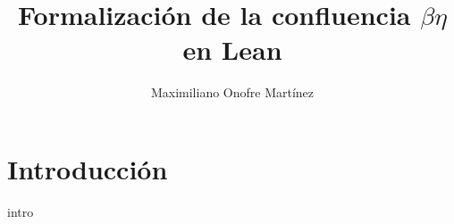 \documentclass[
  spanish,
  letterpaper,
  DIV=11,
  numbers=noendperiod]{scrreprt}
\title{Formalización de la confluencia \(\beta\eta\) en Lean}
\author{Maximiliano Onofre Martínez}
\date{}
\renewcommand*\contentsname{Tabla de contenidos}
\newcommand\contentsname{Tabla de contenidos}
\begin{document}
\maketitle

\theoremstyle{definition}
\newtheorem*{thm}{Theorem}
\newcommand{\thmnm}{Theorem}
\newtheorem*{namedthm}{\thmnm}
\newtheorem*{dfn}{Definition}
\newcommand{\defnm}{Definition}
\newtheorem*{nameddfn}{\defnm}

\newenvironment{nthm}[1]
  {\renewcommand{\thmnm}{#1}\begin{namedthm}}
  {\end{namedthm}}

\newenvironment{ndfn}[1]
  {\renewcommand{\defnm}{#1}\begin{nameddfn}}
  {\end{nameddfn}}

\newenvironment{npf}[1]
  {\begin{proof}[#1]}
  {\end{proof}}


\let\oldgreater\textgreater
\renewcommand{\textgreater}{\null\oldgreater}   %

\renewcommand*\contentsname{Tabla de contenidos}
{
\setcounter{tocdepth}{1}
\tableofcontents
}


\chapter*{Introducción}\label{introducciuxf3n}



intro
\end{document}
